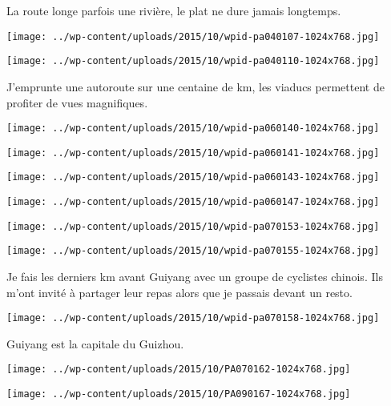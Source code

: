  La route longe parfois une rivière, le plat ne dure jamais longtemps. 
\begin{center} \texttt{[image: ../wp-content/uploads/2015/10/wpid-pa040107-1024x768.jpg]} \end{center}
\begin{center} \texttt{[image: ../wp-content/uploads/2015/10/wpid-pa040110-1024x768.jpg]} \end{center}

  J'emprunte une autoroute sur une centaine de km, les viaducs permettent de profiter de vues magnifiques. 
\begin{center} \texttt{[image: ../wp-content/uploads/2015/10/wpid-pa060140-1024x768.jpg]} \end{center}
\begin{center} \texttt{[image: ../wp-content/uploads/2015/10/wpid-pa060141-1024x768.jpg]} \end{center}
\begin{center} \texttt{[image: ../wp-content/uploads/2015/10/wpid-pa060143-1024x768.jpg]} \end{center}
\begin{center} \texttt{[image: ../wp-content/uploads/2015/10/wpid-pa060147-1024x768.jpg]} \end{center}
\begin{center} \texttt{[image: ../wp-content/uploads/2015/10/wpid-pa070153-1024x768.jpg]} \end{center}
\begin{center} \texttt{[image: ../wp-content/uploads/2015/10/wpid-pa070155-1024x768.jpg]} \end{center}

 Je fais les derniers km avant Guiyang avec un groupe de cyclistes chinois. Ils m'ont invité à partager leur repas alors que je passais devant un resto. 
\begin{center} \texttt{[image: ../wp-content/uploads/2015/10/wpid-pa070158-1024x768.jpg]} \end{center}

\pagebreak
 Guiyang est la capitale du Guizhou. 
 \begin{center} \texttt{[image: ../wp-content/uploads/2015/10/PA070162-1024x768.jpg]} \end{center}
\begin{center} \texttt{[image: ../wp-content/uploads/2015/10/PA090167-1024x768.jpg]} \end{center}

